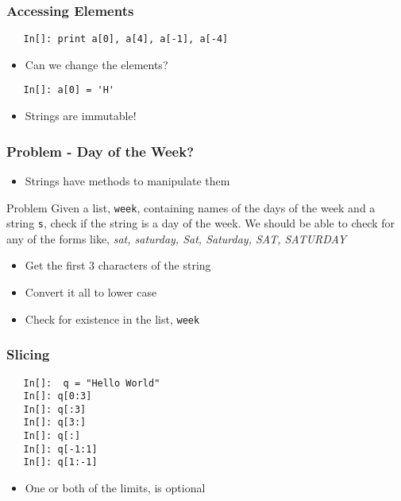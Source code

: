 \begin{frame}[fragile]
  \frametitle{Accessing Elements}
  \begin{lstlisting}
   In[]: print a[0], a[4], a[-1], a[-4]
  \end{lstlisting}
  \begin{itemize}
  \item Can we change the elements?
  \end{itemize}
  \begin{lstlisting}
   In[]: a[0] = 'H'
  \end{lstlisting}
  \begin{itemize}
  \item Strings are immutable!
  \end{itemize}
\end{frame}

\begin{frame}[fragile]
  \frametitle{Problem - Day of the Week?}
  \begin{itemize}
  \item Strings have methods to manipulate them
  \end{itemize}
  \begin{block}{Problem}
    Given a list, \texttt{week}, containing names of the days of the
    week and a string \texttt{s}, check if the string is a day of the
    week. We should be able to check for any of the forms like,
    \emph{sat, saturday, Sat, Saturday, SAT, SATURDAY}
  \end{block}
  \begin{itemize}
  \item Get the first 3 characters of the string
  \item Convert it all to lower case
  \item Check for existence in the list, \texttt{week}
  \end{itemize}
\end{frame}

\begin{frame}[fragile]
  \frametitle{Slicing}
  \begin{lstlisting}
   In[]:  q = "Hello World"
   In[]: q[0:3]
   In[]: q[:3]
   In[]: q[3:]
   In[]: q[:]
   In[]: q[-1:1]
   In[]: q[1:-1]
  \end{lstlisting}
  \begin{itemize}
  \item One or both of the limits, is optional
  \end{itemize}
\end{frame}

